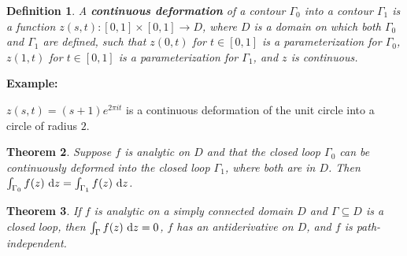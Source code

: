 \documentclass{article}
\theoremstyle{colontheorem}
\newtheorem{theorem}{Theorem}[section]
\newtheorem{definition}[theorem]{Definition}
\newenvironment{Theorem}
{
	\begin{mdframed}[backgroundcolor=TheoremOrange!10]
	\begin{theorem}
}
{
	\end{theorem}
	\end{mdframed}
	
	\vspace{.15in}
}
\newenvironment{Def}
{
	\begin{mdframed}[backgroundcolor=DefGreen!10]
	\begin{definition}
}
{
	\end{definition}
	\end{mdframed}
	
	\vspace{.15in}
}
\newenvironment{Example}
{
	\begin{mdframed}
	\textbf{Example:}%
}
{
	\end{mdframed}
	
	\vspace{.15in}
}
\begin{document}
\begin{Def}
	
	A \textbf{continuous deformation} of a contour $\Gamma_0$ into a contour $\Gamma_1$ is a function $z(s,t) : [0,1] \times [0,1] \longrightarrow D$, where $D$ is a domain on which both $\Gamma_0$ and $\Gamma_1$ are defined, such that $z(0,t)$ for $t \in [0,1]$ is a parameterization for $\Gamma_0$, $z(1,t)$ for $t \in [0,1]$ is a parameterization for $\Gamma_1$, and $z$ is continuous.
	
\end{Def}



\begin{Example}
	$z(s,t) = (s+1)e^{2\pi i t}$ is a continuous deformation of the unit circle into a circle of radius $2$.
	
\end{Example}



\begin{Theorem}
	
	Suppose $f$ is analytic on $D$ and that the closed loop $\Gamma_0$ can be continuously deformed into the closed loop $\Gamma_1$, where both are in $D$. Then $\int_{\Gamma_0} f(z)\ \textnormal{d}z = \int_{\Gamma_1} f(z)\ \textnormal{d}z$.
	
\end{Theorem}



\begin{Theorem}
	
	If $f$ is analytic on a simply connected domain $D$ and $\Gamma \subseteq D$ is a closed loop, then $\int_\Gamma f(z)\ \textnormal{d}z = 0$, $f$ has an antiderivative on $D$, and $f$ is path-independent.
	
\end{Theorem}
\end{document}
